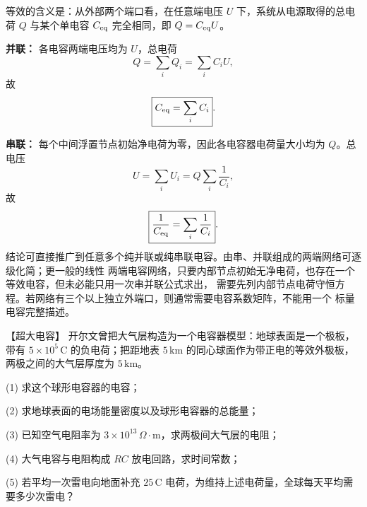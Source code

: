 {\begin{xesolution}
\ThACapNetworks

等效的含义是：从外部两个端口看，在任意端电压 $U$ 下，系统从电源取得的总电荷 $Q$ 与某个单电容
$C_{\rm eq}$ 完全相同，即 $Q=C_{\rm eq}U$。

\textbf{并联：} 各电容两端电压均为 $U$，总电荷
\[
 Q=\sum_iQ_i=\sum_iC_iU,
\]
故
\[
 \boxed{C_{\rm eq}=\sum_iC_i}.
\]

\textbf{串联：} 每个中间浮置节点初始净电荷为零，因此各电容器电荷量大小均为 $Q$。总电压
\[
 U=\sum_iU_i=Q\sum_i\frac1{C_i},
\]
故
\[
 \boxed{\frac1{C_{\rm eq}}=\sum_i\frac1{C_i}}.
\]
结论可直接推广到任意多个纯并联或纯串联电容。由串、并联组成的两端网络可逐级化简；更一般的线性
两端电容网络，只要内部节点初始无净电荷，也存在一个等效电容，但未必能只用一次串并联公式求出，
需要先列内部节点电荷守恒方程。若网络有三个以上独立外端口，则通常需要电容系数矩阵，不能用一个
标量电容完整描述。
\end{xesolution}



\begin{origexamplebox}{【超大电容】}\label{ch20:ex:s35-4-11}
开尔文曾把大气层构造为一个电容器模型：地球表面是一个极板，带有
$5\times10^5\,\mathrm C$ 的负电荷；把距地表 $5\,\mathrm{km}$ 的同心球面作为带正电的等效外极板，两极之间的大气层厚度为 $5\,\mathrm{km}$。

(1) 求这个球形电容器的电容；

(2) 求地球表面的电场能量密度以及球形电容器的总能量；

(3) 已知空气电阻率为 $3\times10^{13}\,\Omega\!\cdot\!\mathrm m$，求两极间大气层的电阻；

(4) 大气电容与电阻构成 $RC$ 放电回路，求时间常数；

(5) 若平均一次雷电向地面补充 $25\,\mathrm C$ 电荷，为维持上述电荷量，全球每天平均需要多少次雷电？

\ThQEarthCapacitor
\end{origexamplebox}\par\nopagebreak[4]



\begin{xesolution}
\par\noindent\begin{minipage}{\linewidth}
\earthCapacitorFigure
{}
\end{minipage}\par\medskip
\ThAEarthCapacitor


\end{xesolution}}
